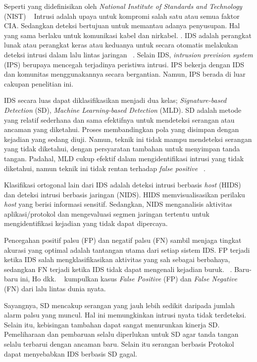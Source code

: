 \documentclass[conference]{IEEEtran}
\begin{document}
Seperti yang didefinisikan oleh \emph{National Institute of Standards and Technology} (NIST) ~\cite{bace2001intrusion} Intrusi adalah upaya untuk kompromi salah satu atau semua faktor CIA. Sedangkan deteksi bertujuan untuk memantau adanya penyusupan. Hal yang sama berlaku untuk komunikasi kabel dan nirkabel. \cite{pelechrinis2010denial, tan2011analysis}. IDS adalah perangkat lunak atau perangkat keras atau keduanya untuk secara otomatis melakukan deteksi intrusi dalam lalu lintas jaringan ~\cite{bace2001intrusion, stavroulakis2010handbook}. Selain IDS, \emph{intrusion prevision system} (IPS) berupaya mencegah terjadinya peristiwa intrusi. IPS bekerja dengan IDS dan komunitas menggunakannya secara bergantian. Namun, IPS berada di luar cakupan penelitian ini.

IDS secara luas dapat diklasifikasikan menjadi dua kelas; \emph{Signature-based Detection} (SD), \emph{Machine Learning-based Detection} (MLD). SD adalah metode yang relatif sederhana dan sama efektifnya untuk mendeteksi serangan atau ancaman yang diketahui. Proses membandingkan pola yang disimpan dengan kejadian yang sedang diuji. Namun, teknik ini tidak mampu mendeteksi serangan yang tidak diketahui, dengan persyaratan tambahan untuk menyimpan tanda tangan. Padahal, MLD cukup efektif dalam mengidentifikasi intrusi yang tidak diketahui, namun teknik ini tidak rentan terhadap \emph{false positive} ~\cite{fragkiadakis2012design, mar2012intelligent, kartit2012new, modi2013survey}.

Klasifikasi ortogonal lain dari IDS adalah deteksi intrusi berbasis \emph{host} (HIDS) dan deteksi intrusi berbasis jaringan (NIDS). HIDS memvisualisasikan perilaku \emph{host} yang berisi informasi sensitif. Sedangkan, NIDS menganalisis aktivitas aplikasi/protokol dan mengevaluasi segmen jaringan tertentu untuk mengidentifikasi kejadian yang tidak dapat dipercaya.

Pencegahan positif palsu (FP) dan negatif palsu (FN) sambil menjaga tingkat akurasi yang optimal adalah tantangan utama dari setiap sistem IDS. FP terjadi ketika IDS salah mengklasifikasikan aktivitas yang sah sebagai berbahaya, sedangkan FN terjadi ketika IDS tidak dapat mengenali kejadian buruk. ~\cite{stavroulakis2010handbook, elshoush2011alert, shanbhag2009accurate}. Baru-baru ini, Ho dkk. ~\cite{ho2012statistical} kumpulkan kasus \emph{False Positive} (FP) dan \emph{False Negative} (FN) dari lalu lintas dunia nyata.

Sayangnya, SD mencakup serangan yang jauh lebih sedikit daripada jumlah alarm palsu yang muncul. Hal ini memungkinkan intrusi nyata tidak terdeteksi. Selain itu, kebisingan tambahan dapat sangat menurunkan kinerja SD. Pemeliharaan dan pembaruan selalu diperlukan untuk SD agar tanda tangan selalu terbarui dengan ancaman baru. Selain itu serangan berbasis Protokol dapat menyebabkan IDS berbasis SD gagal.
\end{document}
